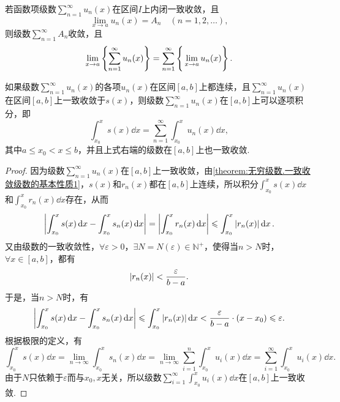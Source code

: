 \begin{property}\label{theorem:无穷级数.一致收敛级数的基本性质2}
若函数项级数\(\sum\limits_{n=1}^\infty u_n(x)\)在区间\(I\)上内闭一致收敛，且\[
\lim\limits_{x \to a} u_n(x) = A_n
\quad(n=1,2,\dotsc),
\]
则级数\(\sum\limits_{n=1}^\infty A_n\)收敛，且\[
\lim\limits_{x \to a} \left\{
	\sum\limits_{n=1}^\infty u_n(x)
\right\}
= \sum\limits_{n=1}^\infty \left\{
	\vphantom{\sum\limits_{n=1}^\infty }
	\lim\limits_{x \to a} u_n(x)
\right\}.
\]
\end{property}

\begin{property}\label{theorem:无穷级数.一致收敛级数的基本性质3}
\def\s{\sum\limits_{n=1}^\infty }
如果级数\(\s u_n(x)\)的各项\(u_n(x)\)在区间\([a,b]\)上都连续，且\(\s u_n(x)\)在区间\([a,b]\)上一致收敛于\(s(x)\)，则级数\(\s u_n(x)\)在\([a,b]\)上可以逐项积分，即\[
\int_{x_0}^x s(x) \dd{x}
= \s \int_{x_0}^x u_n(x) \dd{x},
\]其中\(a \leqslant x_0 < x \leqslant b\)，并且上式右端的级数在\([a,b]\)上也一致收敛.
\begin{proof}
因为级数\(\s u_n(x)\)在\([a,b]\)上一致收敛，由\cref{theorem:无穷级数.一致收敛级数的基本性质1}，\(s(x)\)和\(r_n(x)\)都在\([a,b]\)上连续，所以积分\(\int_{x_0}^x s(x) \dd{x}\)和\(\int_{x_0}^x r_n(x) \dd{x}\)存在，从而\[
\abs{\int_{x_0}^x s(x) \dd{x} - \int_{x_0}^x s_n(x) \dd{x}}
= \abs{\int_{x_0}^x r_n(x) \dd{x}}
\leqslant \int_{x_0}^x \abs{r_n(x)} \dd{x}.
\]又由级数的一致收敛性，\(\forall\varepsilon>0\)，\(\exists N = N(\varepsilon) \in \mathbb{N}^+\)，使得当\(n > N\)时，\(\forall x \in [a,b]\)，都有\[
\abs{r_n(x)} < \frac{\varepsilon}{b-a}.
\]于是，当\(n > N\)时，有\[
\abs{\int_{x_0}^x s(x) \dd{x} - \int_{x_0}^x s_n(x) \dd{x}}
\leqslant \int_{x_0}^x \abs{r_n(x)} \dd{x}
< \frac{\varepsilon}{b-a} \cdot (x-x_0)
\leqslant \varepsilon.
\]根据极限的定义，有\[
\int_{x_0}^x s(x) \dd{x}
= \lim\limits_{n\to\infty} \int_{x_0}^x s_n(x) \dd{x}
= \lim\limits_{n\to\infty} \sum\limits_{i=1}^n \int_{x_0}^x u_i(x) \dd{x}
= \sum\limits_{i=1}^\infty \int_{x_0}^x u_i(x) \dd{x}.
\]由于\(N\)只依赖于\(\varepsilon\)而与\(x_0,x\)无关，所以级数\(\sum\limits_{i=1}^\infty \int_{x_0}^x u_i(x) \dd{x}\)在\([a,b]\)上一致收敛.
\end{proof}
\end{property}

